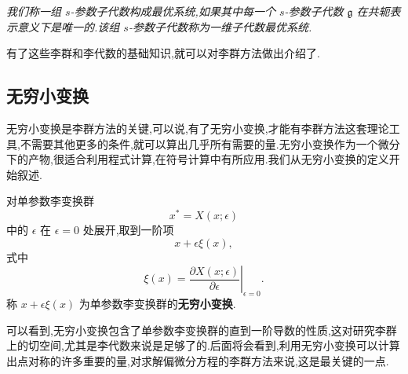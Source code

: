 \begin{definition}[一维子代数最优系统]
    \emph{我们称一组 $s$-参数子代数构成最优系统,如果其中每一个 $s$-参数子代数 $\mathfrak{g}$ 在共轭表示意义下是唯一的.该组 $s$-参数子代数称为一维子代数最优系统.}
\end{definition}

有了这些李群和李代数的基础知识,就可以对李群方法做出介绍了.

\subsection{无穷小变换}
无穷小变换是李群方法的关键,可以说,有了无穷小变换,才能有李群方法这套理论工具,不需要其他更多的条件,就可以算出几乎所有需要的量.无穷小变换作为一个微分下的产物,很适合利用程式计算,在符号计算中有所应用.我们从无穷小变换的定义开始叙述.


对单参数李变换群
\begin{equation}\label{eq:liet}
x^{*}=X(x;\epsilon)
\end{equation}
中的 $\epsilon$ 在 $\epsilon=0$ 处展开,取到一阶项
\begin{equation*}
x+\epsilon \xi(x),
\end{equation*}
式中
\begin{equation*}
\xi(x)=\left.\frac{\partial X(x;\epsilon)}{\partial \epsilon}\right|_{\epsilon=0}.
\end{equation*}
称 $x+\epsilon \xi(x)$ 为单参数李变换群的\textbf{无穷小变换}.

可以看到,无穷小变换包含了单参数李变换群的直到一阶导数的性质,这对研究李群上的切空间,尤其是李代数来说是足够了的.后面将会看到,利用无穷小变换可以计算出点对称的许多重要的量,对求解偏微分方程的李群方法来说,这是最关键的一点.

